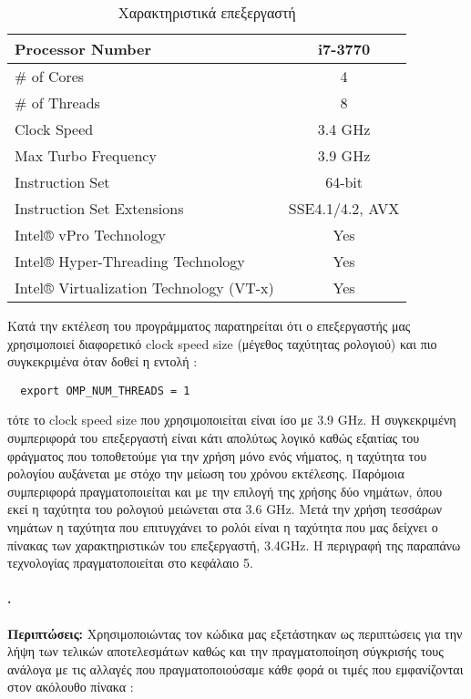 \documentclass[greek,booktabs,8pt,flagBlueCMYK]{report}
\begin{document}
\begin {table}[H]
\begin{center}
\label{tab:table_1}
\begin{tabular}{ l | c }
  \hline
  Processor Number &	i7-3770 \\ \hline
  \# of Cores &	4 \\ \hline
  \# of Threads &	8 \\ \hline
  Clock Speed &	3.4 GHz \\ \hline
  Max Turbo Frequency &	3.9 GHz \\ \hline
  Instruction Set &	64-bit\\ \hline
  Instruction Set Extensions &	SSE4.1/4.2, AVX\\ \hline
  Intel® vPro Technology	& Yes\\ \hline
  Intel® Hyper-Threading Technology &	Yes\\ \hline
  Intel® Virtualization Technology (VT-x) & 	Yes\\ \hline
\end {tabular}
\caption {Χαρακτηριστικά επεξεργαστή}
\end{center}
\end {table}

Κατά την εκτέλεση του προγράμματος παρατηρείται ότι ο επεξεργαστής μας χρησιμοποιεί διαφορετικό clock speed size (μέγεθος ταχύτητας ρολογιού) και πιο συγκεκριμένα όταν δοθεί η εντολή :
\begin{lstlisting}
  export OMP_NUM_THREADS = 1
\end{lstlisting}
τότε το clock speed size που χρησιμοποιείται είναι ίσο με 3.9 GHz. Η συγκεκριμένη συμπεριφορά του επεξεργαστή είναι κάτι απολύτως λογικό καθώς εξαιτίας του φράγματος που τοποθετούμε για την χρήση μόνο ενός νήματος, η ταχύτητα του ρολογίου αυξάνεται με στόχο την μείωση του χρόνου εκτέλεσης. 
\FloatBarrier
Παρόμοια συμπεριφορά πραγματοποιείται και με την επιλογή της χρήσης δύο νημάτων, όπου εκεί η ταχύτητα του ρολογιού μειώνεται στα 3.6 GHz. 
\FloatBarrier
Μετά την χρήση τεσσάρων νημάτων η ταχύτητα που επιτυγχάνει το ρολόι είναι η ταχύτητα που μας δείχνει ο πίνακας των χαρακτηριστικών του επεξεργαστή, 3.4GHz.
Η περιγραφή της παραπάνω τεχνολογίας πραγματοποιείται στο κεφάλαιο 5.

\clearpage
\paragraph{.} \textbf{Περιπτώσεις:}\newline
Χρησιμοποιώντας τον κώδικα μας εξετάστηκαν ως περιπτώσεις για την λήψη των τελικών αποτελεσμάτων καθώς και την πραγματοποίηση σύγκρισής τους ανάλογα με τις αλλαγές που πραγματοποιούσαμε κάθε φορά οι τιμές που εμφανίζονται στον ακόλουθο πίνακα :
\end{document}
